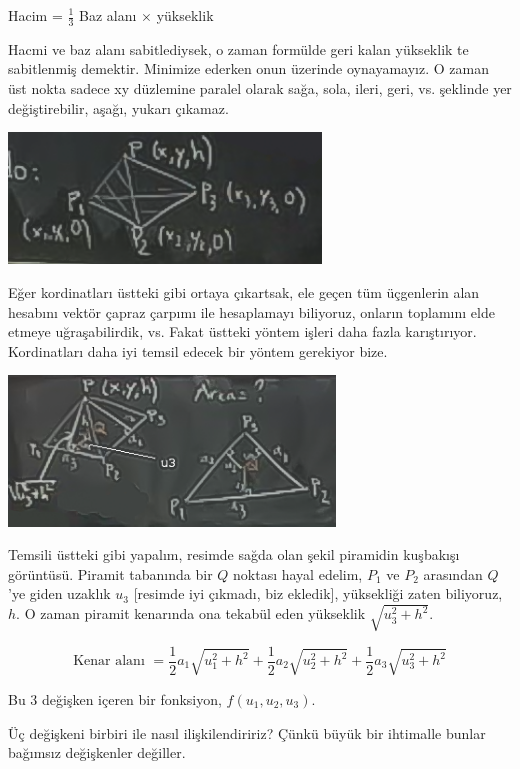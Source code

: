 \documentclass[12pt,fleqn]{article}\usepackage{../../common}
\begin{document}
Hacim = $\frac{1}{3}$ Baz alanı $\times$ yükseklik

Hacmi ve baz alanı sabitlediysek, o zaman formülde geri kalan yükseklik te
sabitlenmiş demektir. Minimize ederken onun üzerinde oynayamayız. O zaman
üst nokta sadece xy düzlemine paralel olarak sağa, sola, ileri, geri,
vs. şeklinde yer değiştirebilir, aşağı, yukarı çıkamaz. 

\begin{center}
\includegraphics[height=3.5cm]{13_9.png}
\end{center}

Eğer kordinatları üstteki gibi ortaya çıkartsak, ele geçen tüm üçgenlerin
alan hesabını vektör çapraz çarpımı ile hesaplamayı biliyoruz, onların
toplamını elde etmeye uğraşabilirdik, vs. Fakat üstteki yöntem işleri daha
fazla karıştırıyor. Kordinatları daha iyi temsil edecek bir yöntem
gerekiyor bize.

\begin{center}
\includegraphics[height=4cm]{13_10.png}
\end{center}

Temsili üstteki gibi yapalım, resimde sağda olan şekil piramidin kuşbakışı
görüntüsü. Piramit tabanında bir $Q$ noktası hayal edelim, $P_1$  ve $P_2$
arasından $Q$'ye giden uzaklık $u_3$ [resimde iyi çıkmadı, biz ekledik],
yüksekliği zaten biliyoruz, $h$. O zaman piramit kenarında ona tekabül eden
yükseklik $\sqrt{u_3^2 + h^2}$. 

$$ \textrm{Kenar alanı } = 
\frac{1}{2}a_1 \sqrt{u_1^2 + h^2} + 
\frac{1}{2}a_2 \sqrt{u_2^2 + h^2} + 
\frac{1}{2}a_3 \sqrt{u_3^2 + h^2} 
 $$

Bu 3 değişken içeren bir fonksiyon, $f(u_1,u_2,u_3)$. 

Üç değişkeni birbiri ile nasıl ilişkilendiririz? Çünkü büyük bir ihtimalle
bunlar bağımsız değişkenler değiller.
\end{document}
